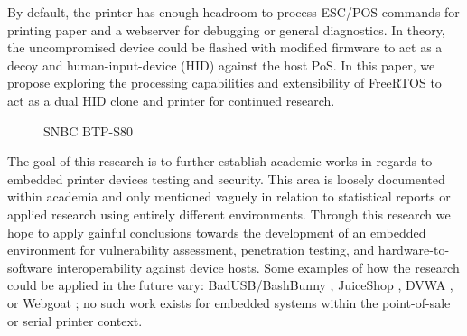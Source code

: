 By default, the printer has enough headroom to process ESC/POS commands for printing paper and a webserver for debugging or general diagnostics. In theory, the uncompromised device could be flashed with modified firmware to act as a decoy and human-input-device (HID) against the host PoS. In this paper, we propose exploring the processing capabilities and extensibility of FreeRTOS to act as a dual HID clone and printer for continued research. 

\begin{figure}[ht]%
  \centering
  \qquad
  \caption{SNBC BTP-S80}%
  \label{fig:btp_s80}%
\end{figure}

The goal of this research is to further establish academic works in regards to embedded printer devices testing and security. This area is loosely documented within academia and only mentioned vaguely in relation to statistical reports or applied research using entirely different environments. Through this research we hope to apply gainful conclusions towards the development of an embedded environment for vulnerability assessment, penetration testing, and hardware-to-software interoperability against device hosts. Some examples of how the research could be applied in the future vary: BadUSB/BashBunny \autocite{hak5BashBunny}, JuiceShop \autocite{OWASPJuiceShop}, DVWA \autocite{woodDAMNVULNERABLEWEB2023}, or Webgoat \autocite{OWASPWebGoatOWASP}; no such work exists for embedded systems within the point-of-sale or serial printer context.

